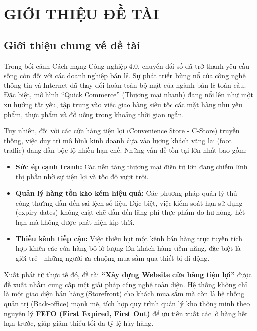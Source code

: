 \chapter{GIỚI THIỆU ĐỀ TÀI}
\label{ch:chapter1}

\section{Giới thiệu chung về đề tài}

Trong bối cảnh Cách mạng Công nghiệp 4.0, chuyển đổi số đã trở thành yêu cầu sống còn đối với các doanh nghiệp bán lẻ. Sự phát triển bùng nổ của công nghệ thông tin và Internet đã thay đổi hoàn toàn bộ mặt của ngành bán lẻ toàn cầu. Đặc biệt, mô hình ``Quick Commerce'' (Thương mại nhanh) đang nổi lên như một xu hướng tất yếu, tập trung vào việc giao hàng siêu tốc các mặt hàng nhu yếu phẩm, thực phẩm và đồ uống trong khoảng thời gian ngắn.

Tuy nhiên, đối với các cửa hàng tiện lợi (Convenience Store - C-Store) truyền thống, việc duy trì mô hình kinh doanh dựa vào lượng khách vãng lai (foot traffic) đang dần bộc lộ nhiều hạn chế. Những vấn đề tồn tại lớn nhất bao gồm:

\begin{itemize}
    \item \textbf{Sức ép cạnh tranh:} Các nền tảng thương mại điện tử lớn đang chiếm lĩnh thị phần nhờ sự tiện lợi và tốc độ vượt trội.
    \item \textbf{Quản lý hàng tồn kho kém hiệu quả:} Các phương pháp quản lý thủ công thường dẫn đến sai lệch số liệu. Đặc biệt, việc kiểm soát hạn sử dụng (expiry dates) không chặt chẽ dẫn đến lãng phí thực phẩm do hư hỏng, hết hạn mà không được phát hiện kịp thời.
    \item \textbf{Thiếu kênh tiếp cận:} Việc thiếu hụt một kênh bán hàng trực tuyến tích hợp khiến các cửa hàng bỏ lỡ lượng lớn khách hàng tiềm năng, đặc biệt là giới trẻ - những người ưa chuộng mua sắm qua thiết bị di động.
\end{itemize}

Xuất phát từ thực tế đó, đề tài \textbf{``Xây dựng Website cửa hàng tiện lợi''} được đề xuất nhằm cung cấp một giải pháp công nghệ toàn diện. Hệ thống không chỉ là một giao diện bán hàng (Storefront) cho khách mua sắm mà còn là hệ thống quản trị (Back-office) mạnh mẽ, tích hợp quy trình quản lý kho thông minh theo nguyên lý \textbf{FEFO (First Expired, First Out)} để ưu tiên xuất các lô hàng hết hạn trước, giúp giảm thiểu tối đa tỷ lệ hủy hàng.

